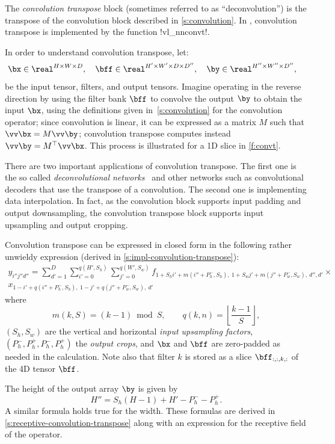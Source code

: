 The \emph{convolution transpose} block (sometimes referred to as ``deconvolution'') is the transpose of the convolution block described in \cref{s:convolution}. In \matconvnet, convolution transpose is  implemented by the function !vl_nnconvt!.

In order to understand convolution transpose, let:
\[
 \bx\in\real^{H \times W \times D}, \quad
 \bff\in\real^{H' \times W' \times D \times D''}, \quad
 \by\in\real^{H'' \times W'' \times D''}, \quad
\]
be the input tensor, filters, and output tensors. Imagine operating in the reverse direction by using the filter bank $\bff$ to convolve the output $\by$ to obtain the input $\bx$, using the definitions given in~\cref{s:convolution} for the convolution operator; since convolution is linear, it can be expressed as a matrix $M$ such that  $\vv \bx = M \vv\by$; convolution transpose computes instead $\vv \by = M^\top \vv \bx$. This process is illustrated for a 1D slice in \cref{f:convt}.

There are two important applications of convolution transpose. The first one is the so called \emph{deconvolutional networks}~\cite{zeiler14visualizing} and other networks such as convolutional decoders that use the transpose of a convolution. The second one is implementing data interpolation. In fact, as the convolution block supports input padding and output downsampling, the convolution transpose block supports input upsampling and output cropping.

Convolution transpose can be expressed in closed form in the following rather unwieldy expression (derived in \cref{s:impl-convolution-transpose}):
\begin{multline}\label{e:convt}
y_{i''j''d''} =
 \sum_{d'=1}^{D}
 \sum_{i'=0}^{q(H',S_h)}
 \sum_{j'=0}^{q(W',S_w)}
f_{
1+ S_hi' + m(i''+ P_h^-, S_h),\ %
1+ S_wj' + m(j''+ P_w^-, S_w),\ %
d'',
d'
}
\times \\
x_{
1 - i' + q(i''+P_h^-,S_h),\ %
1 - j' + q(j''+P_w^-,S_w),\ %
d'
}
\end{multline}
where
\[
m(k,S) = (k - 1) \bmod S,
\qquad
q(k,n) = \left\lfloor \frac{k-1}{S} \right\rfloor,
\]
$(S_h,S_w)$ are the vertical and horizontal \emph{input upsampling factors},  $(P_h^-,P_h^+,P_h^-,P_h^+)$ the \emph{output crops}, and $\bx$ and $\bff$ are zero-padded as needed in the calculation. Note also that filter $k$ is stored as a slice $\bff_{:,:,k,:}$ of the 4D tensor $\bff$.

The height of the output array $\by$ is given by
\[
  H'' = S_h (H - 1) + H' -P^-_h - P^+_h.
\]
A similar formula holds true for the width. These formulas are derived in \cref{s:receptive-convolution-transpose} along with an expression for the receptive field of the operator.

